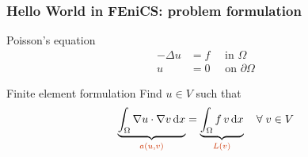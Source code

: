 \begin{frame}
  \frametitle{Hello World in FEniCS: problem formulation}

  \begin{block}{Poisson's equation}
    \vspace{-0.5cm}
    \begin{displaymath}
      \begin{split}
        -\Delta u &= f \quad \mbox{ in } \Omega \\
        u &= 0 \quad \mbox { on } \partial\Omega
      \end{split}
    \end{displaymath}
  \end{block}

  \begin{block}{Finite element formulation}
    \vspace{1ex}
    Find $u \in V$ such that
    \begin{displaymath}
      \underbrace{\int_{\Omega} \nabla u \cdot \nabla v \dx}_{\textcolor{fenicsred}{a(u,v)}}
      = \underbrace{\int_{\Omega} f \, v \dx}_{\textcolor{fenicsred}{L(v)}}
      \quad \foralls v \in V
    \end{displaymath}
  \end{block}

\end{frame}
